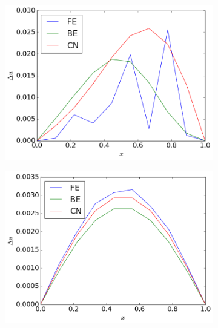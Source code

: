 \documentclass[12pt, a4paper]{article}
\begin{document}
\begin{figure}[ht!]
	\centering 
  	\begin{subfigure}[b]{0.495\textwidth}
		\includegraphics[width=\textwidth]{../Programs/Output/Delta_t1_1d_9.png}
  	\end{subfigure}
  	\begin{subfigure}[b]{0.495\textwidth}
		\includegraphics[width=\textwidth]{../Programs/Output/Delta_t2_1d_9.png}
  	\end{subfigure}
  	\begin{subfigure}[b]{0.495\textwidth}

\end{subfigure}
\end{figure}
\end{document}
